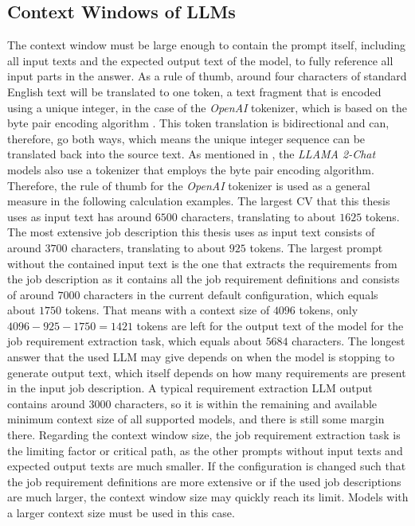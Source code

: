 \documentclass[draft,final]{thesisclass} %
\begin{document}
\subsection{Context Windows of \acs{LLM}s}
The context window must be large enough to contain the prompt itself, including all input texts and the expected output text of the model, to fully reference all input parts in the answer.
As a rule of thumb, around four characters of standard English text will be translated to one token, a text fragment that is encoded using a unique integer, in the case of the \textit{OpenAI} tokenizer, which is based on the byte pair encoding algorithm \parencite{openai_tokenizer}. 
This token translation is bidirectional and can, therefore, go both ways, which means the unique integer sequence can be translated back into the source text.
As mentioned in \textcite[6]{llama2}, the \textit{LLAMA 2-Chat} models also use a tokenizer that employs the byte pair encoding algorithm. Therefore, the rule of thumb for the \textit{OpenAI} tokenizer is used as a general measure in the following calculation examples.
The largest \acs{CV} that this thesis uses as input text has around $6500$ characters, translating to about $1625$ tokens.
The most extensive job description this thesis uses as input text consists of around $3700$ characters, translating to about $925$ tokens.
The largest prompt without the contained input text is the one that extracts the requirements from the job description as it contains all the job requirement definitions and consists of around $7000$ characters in the current default configuration, which equals about $1750$ tokens.
That means with a context size of $4096$ tokens, only $4096-925-1750=1421$ tokens are left for the output text of the model for the job requirement extraction task, which equals about $5684$ characters.
The longest answer that the used \acs{LLM} may give depends on when the model is stopping to generate output text, which itself depends on how many requirements are present in the input job description.
A typical requirement extraction \acs{LLM} output contains around $3000$ characters, so it is within the remaining and available minimum context size of all supported models, and there is still some margin there.
Regarding the context window size, the job requirement extraction task is the limiting factor or critical path, as the other prompts without input texts and expected output texts are much smaller.
If the configuration is changed such that the job requirement definitions are more extensive or if the used job descriptions are much larger, the context window size may quickly reach its limit. Models with a larger context size must be used in this case.
\end{document}
